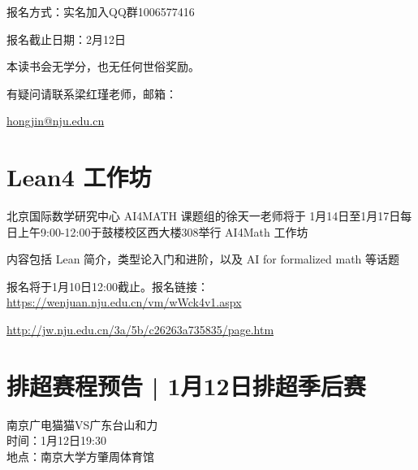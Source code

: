 \documentclass[letterpaper, 12pt]{article}
\begin{document}
\begin{multicols}{2}
报名方式：实名加入QQ群1006577416

报名截止日期：2月12日

本读书会无学分，也无任何世俗奖励。

有疑问请联系梁红瑾老师，邮箱：

\href{mailto:hongjin@nju.edu.cn}{hongjin@nju.edu.cn}
\section{Lean4 工作坊}
北京国际数学研究中心 AI4MATH 课题组的徐天一老师将于 1月14日至1月17日每日上午9:00-12:00于鼓楼校区西大楼308举行 AI4Math 工作坊

内容包括 Lean 简介，类型论入门和进阶，以及 AI for formalized math 等话题

报名将于1月10日12:00截止。报名链接：\url{https://wenjuan.nju.edu.cn/vm/wWck4v1.aspx}

\url{http://jw.nju.edu.cn/3a/5b/c26263a735835/page.htm}
\section{排超赛程预告 | 1月12日排超季后赛}
南京广电猫猫VS广东台山和力\\
时间：1月12日19:30\\
地点：南京大学方肇周体育馆\\

\end{multicols} 
\end{document}
